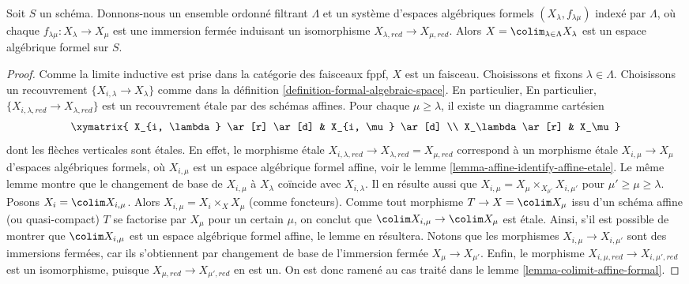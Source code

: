 \begin{lemma}
\label{lemma-colimit-formal-spaces-is-formal-space}
Soit $S$ un schéma. Donnons-nous un ensemble ordonné filtrant
$\Lambda$ et un système d'espaces algébriques formels
$(X_\lambda, f_{\lambda \mu})$ indexé par $\Lambda$, où chaque
$f_{\lambda \mu} : X_\lambda \to X_\mu$ est une immersion fermée
induisant un isomorphisme $X_{\lambda, red} \to X_{\mu, red}$.
Alors $X = \colim_{\lambda \in \Lambda} X_\lambda$
est un espace algébrique formel sur $S$.
\end{lemma}

\begin{proof}
Comme la limite inductive est prise dans la catégorie des faisceaux fppf,
$X$ est un faisceau. Choisissons et fixons $\lambda \in \Lambda$. Choisissons
un recouvrement $\{X_{i, \lambda} \to X_\lambda\}$ comme dans la définition
\ref{definition-formal-algebraic-space}. En particulier,
En particulier, $\{X_{i, \lambda, red} \to X_{\lambda, red}\}$ est un
recouvrement \'etale par des schémas affines.
Pour chaque $\mu \geq \lambda$, il existe un diagramme cartésien
$$
\xymatrix{
X_{i, \lambda} \ar[r] \ar[d] & X_{i, \mu} \ar[d] \\
X_\lambda \ar[r] & X_\mu
}
$$
dont les flèches verticales sont \'etales. En effet, le morphisme \'etale
$X_{i, \lambda, red} \to X_{\lambda, red} = X_{\mu, red}$
correspond à un morphisme \'etale $X_{i, \mu} \to X_\mu$
d'espaces algébriques formels, où $X_{i, \mu}$ est un espace
algébrique formel affine, voir le
lemme \ref{lemma-affine-identify-affine-etale}.
Le même lemme montre que le changement de base de $X_{i, \mu}$ à $X_\lambda$
coïncide avec $X_{i, \lambda}$. Il en résulte aussi que
$X_{i, \mu} = X_\mu \times_{X_{\mu'}} X_{i, \mu'}$ pour
$\mu' \geq \mu \geq \lambda$. Posons $X_i = \colim X_{i, \mu}$.
Alors $X_{i, \mu} = X_i \times_X X_\mu$ (comme foncteurs).
Comme tout morphisme $T \to X = \colim X_\mu$
issu d'un schéma affine (ou quasi-compact) $T$ se factorise par $X_\mu$
pour un certain $\mu$, on conclut que
$\colim X_{i, \mu} \to \colim X_\mu$ est \'etale.
Ainsi, s'il est possible de montrer que $\colim X_{i, \mu}$ est un espace
algébrique formel affine, le lemme en résultera.
Notons que les morphismes $X_{i, \mu} \to X_{i, \mu'}$
sont des immersions fermées, car ils s'obtiennent par changement de base de l'immersion fermée
$X_\mu \to X_{\mu'}$. Enfin, le morphisme
$X_{i, \mu, red} \to X_{i, \mu', red}$ est un isomorphisme,
puisque $X_{\mu, red} \to X_{\mu', red}$ en est un.
On est donc ramené au cas traité dans le
lemme \ref{lemma-colimit-affine-formal}.
\end{proof}








